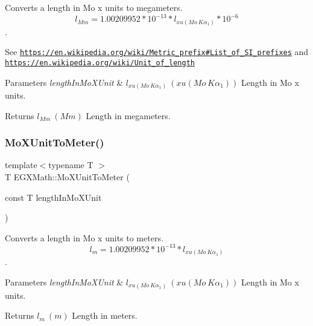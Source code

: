 Converts a length in Mo x units to megameters. \[ l_{Mm}=1.00209952*10^{-13} * l_{xu(Mo\ K\alpha_1)} * 10^{-6} \]. 

See \href{https://en.wikipedia.org/wiki/Metric_prefix#List_of_SI_prefixes}{\tt https\+://en.\+wikipedia.\+org/wiki/\+Metric\+\_\+prefix\#\+List\+\_\+of\+\_\+\+S\+I\+\_\+prefixes} and \href{https://en.wikipedia.org/wiki/Unit_of_length}{\tt https\+://en.\+wikipedia.\+org/wiki/\+Unit\+\_\+of\+\_\+length} 
\begin{DoxyParams}{Parameters}
{\em length\+In\+Mo\+X\+Unit} & $ l_{xu(Mo\ K\alpha_1)}\ (xu(Mo\ K\alpha_1))$ Length in Mo x units. \\
\hline
\end{DoxyParams}
\begin{DoxyReturn}{Returns}
$ l_{Mm}\ (Mm)$ Length in megameters. 
\end{DoxyReturn}
\mbox{\label{group___e_g_x_math-_conversions-_length_conversions-_non-_s_i-_mo_x_unit-_s_i_gac13a59e6a52dfa24e2a39ff579ae60bb}} 
\subsubsection{\texorpdfstring{Mo\+X\+Unit\+To\+Meter()}{MoXUnitToMeter()}}
{\footnotesize\ttfamily template$<$typename T $>$ \\
T E\+G\+X\+Math\+::\+Mo\+X\+Unit\+To\+Meter (\begin{DoxyParamCaption}\item[{const T}]{length\+In\+Mo\+X\+Unit }\end{DoxyParamCaption})}



Converts a length in Mo x units to meters. \[ l_{m}=1.00209952*10^{-13} * l_{xu(Mo\ K\alpha_1)} \]. 


\begin{DoxyParams}{Parameters}
{\em length\+In\+Mo\+X\+Unit} & $ l_{xu(Mo\ K\alpha_1)}\ (xu(Mo\ K\alpha_1))$ Length in Mo x units. \\
\hline
\end{DoxyParams}
\begin{DoxyReturn}{Returns}
$ l_{m}\ (m)$ Length in meters. 
\end{DoxyReturn}
\mbox{\label{group___e_g_x_math-_conversions-_length_conversions-_non-_s_i-_mo_x_unit-_s_i_ga1608daf69fda5b90eabc5f8d47831f18}} 
